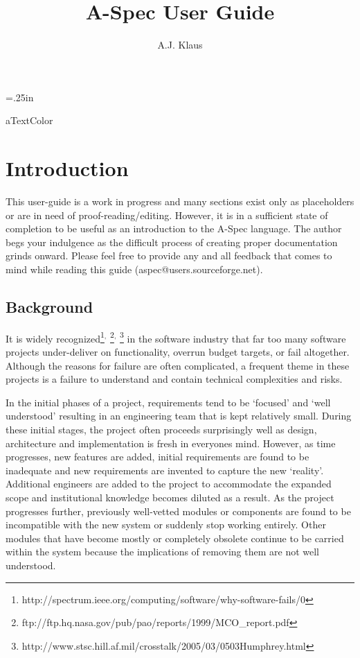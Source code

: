 \documentclass[letterpaper,10pt,draft]{book}
\title{A-Spec User Guide}
\author{A.J. Klaus}
\begin{document}
\raggedright
\raggedbottom

\parindent=.25in

\csname aTextColor\endcsname

\maketitle
\tableofcontents

\chapter{Introduction}
   \label{ch:Intro}

This user-guide is a work in progress and many sections exist only as placeholders
or are in need of proof-reading/editing.  However, it is in a sufficient state of
completion to be useful as an introduction to the A-Spec language.  The author begs
your indulgence as the difficult process of creating proper documentation grinds
onward.  Please feel free to provide any and all feedback that comes to mind while
reading this guide (aspec@users.sourceforge.net).

\section{Background}
   \label{sect:Background}

It is widely recognized\footnote{http://spectrum.ieee.org/computing/software/why-software-fails/0}$^,$
\footnote{ftp://ftp.hq.nasa.gov/pub/pao/reports/1999/MCO\_report.pdf}$^,$
\footnote{http://www.stsc.hill.af.mil/crosstalk/2005/03/0503Humphrey.html} in the
software industry that far too many software projects under-deliver on functionality,
overrun budget targets, or fail altogether.  Although the reasons for failure are
often complicated, a frequent theme in these projects is a failure to understand
and contain technical complexities and risks.

In the initial phases of a project, requirements tend to be `focused' and `well
understood' resulting in an engineering team that is kept relatively small.  During
these initial stages, the project often proceeds surprisingly well as design, architecture
and implementation is fresh in everyones mind.  However, as time progresses, new
features are added, initial requirements are found to be inadequate and new requirements
are invented to capture the new `reality'.  Additional engineers are added to the
project to accommodate the expanded scope and institutional knowledge becomes diluted
as a result.  As the project progresses further, previously well-vetted modules or
components are found to be incompatible with the new system or suddenly stop working
entirely.  Other modules that have become mostly or completely obsolete continue
to be carried within the system because the implications of removing them are not
well understood.
\end{document}
